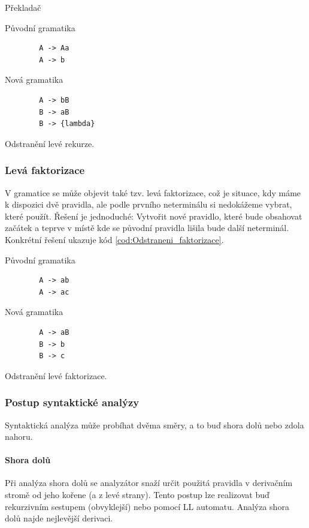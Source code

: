 \begin{definiceN}{Překladač}
\begin{kod}[h]
	Původní gramatika
	\begin{verbatim}
		A -> Aa
		A -> b
	\end{verbatim}
	
	Nová gramatika
	\begin{verbatim}
		A -> bB
		B -> aB
		B -> {lambda}
	\end{verbatim}
	\caption{Odstranění levé rekurze.}
	\label{cod:Odstraneni_rekurze}
\end{kod}


\subsubsection{Levá faktorizace}

V gramatice se může objevit také tzv. levá faktorizace, což je situace, kdy máme k dispozici dvě pravidla, ale podle prvního neterminálu si nedokážeme vybrat, které použít. Řešení je jednoduché: Vytvořit nové pravidlo, které bude obsahovat začátek a teprve v místě kde se původní pravidla lišila bude další neterminál. Konkrétní řešení ukazuje kód \ref{cod:Odstraneni_faktorizace}.

\begin{kod}[h]
	Původní gramatika
	\begin{verbatim}
		A -> ab
		A -> ac
	\end{verbatim}
	
	Nová gramatika
	\begin{verbatim}
		A -> aB
		B -> b
		B -> c
	\end{verbatim}
	\caption{Odstranění levé faktorizace.}
	\label{cod:Odstraneni_faktorizace}
\end{kod}


\subsubsection{Postup syntaktické analýzy}

Syntaktická analýza může probíhat dvěma směry, a to buď shora dolů nebo zdola nahoru.

\paragraph{Shora dolů} Při analýza shora dolů se analyzátor snaží určit použitá pravidla v derivačním stromě od jeho kořene (a z levé strany). Tento postup lze realizovat buď rekurzivním sestupem (obvyklejší) nebo pomocí LL automatu. Analýza shora dolů najde nejlevější derivaci.


\end{definiceN}
